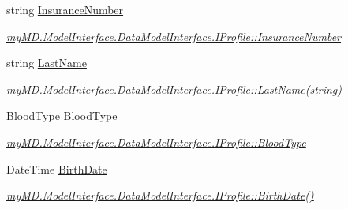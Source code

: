 \begin{CompactItemize}
\item 
\hypertarget{classmy_m_d_1_1_model_1_1_data_model_1_1_profile_7f862f9fe6a3c846f41b4f1e1bbc9872}{
string \hyperlink{classmy_m_d_1_1_model_1_1_data_model_1_1_profile_7f862f9fe6a3c846f41b4f1e1bbc9872}{Insurance\-Number}}
\label{d6/d2c/classmy_m_d_1_1_model_1_1_data_model_1_1_profile_7f862f9fe6a3c846f41b4f1e1bbc9872}

\begin{CompactList}\small\item\em \hyperlink{interfacemy_m_d_1_1_model_interface_1_1_data_model_interface_1_1_i_profile_7f862f9fe6a3c846f41b4f1e1bbc9872}{my\-MD.Model\-Interface.Data\-Model\-Interface.IProfile::Insurance\-Number} \item\end{CompactList}\item 
\hypertarget{classmy_m_d_1_1_model_1_1_data_model_1_1_profile_539c5300bf48f8a3e3009ce33d49a240}{
string \hyperlink{classmy_m_d_1_1_model_1_1_data_model_1_1_profile_539c5300bf48f8a3e3009ce33d49a240}{Last\-Name}}
\label{d6/d2c/classmy_m_d_1_1_model_1_1_data_model_1_1_profile_539c5300bf48f8a3e3009ce33d49a240}

\begin{CompactList}\small\item\em my\-MD.Model\-Interface.Data\-Model\-Interface.IProfile::Last\-Name(string) \item\end{CompactList}\item 
\hypertarget{classmy_m_d_1_1_model_1_1_data_model_1_1_profile_ae7d78aea8d446d685c618fcde65e1a9}{
\hyperlink{namespacemy_m_d_1_1_model_interface_1_1_data_model_interface_ae7d78aea8d446d685c618fcde65e1a9}{Blood\-Type} \hyperlink{classmy_m_d_1_1_model_1_1_data_model_1_1_profile_ae7d78aea8d446d685c618fcde65e1a9}{Blood\-Type}}
\label{d6/d2c/classmy_m_d_1_1_model_1_1_data_model_1_1_profile_ae7d78aea8d446d685c618fcde65e1a9}

\begin{CompactList}\small\item\em \hyperlink{interfacemy_m_d_1_1_model_interface_1_1_data_model_interface_1_1_i_profile_ae7d78aea8d446d685c618fcde65e1a9}{my\-MD.Model\-Interface.Data\-Model\-Interface.IProfile::Blood\-Type} \item\end{CompactList}\item 
\hypertarget{classmy_m_d_1_1_model_1_1_data_model_1_1_profile_a9700d17acaae76630e4882a92f36b22}{
Date\-Time \hyperlink{classmy_m_d_1_1_model_1_1_data_model_1_1_profile_a9700d17acaae76630e4882a92f36b22}{Birth\-Date}}
\label{d6/d2c/classmy_m_d_1_1_model_1_1_data_model_1_1_profile_a9700d17acaae76630e4882a92f36b22}

\begin{CompactList}\small\item\em \hyperlink{interfacemy_m_d_1_1_model_interface_1_1_data_model_interface_1_1_i_profile_a9700d17acaae76630e4882a92f36b22}{my\-MD.Model\-Interface.Data\-Model\-Interface.IProfile::Birth\-Date()} \item\end{CompactList}\end{CompactItemize}


